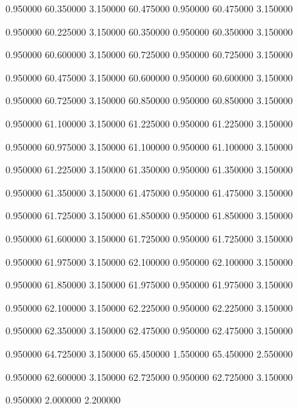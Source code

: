  {0.950000} {60.350000} {3.150000} {60.475000} {0.950000} {60.475000} {3.150000}

 {0.950000} {60.225000} {3.150000} {60.350000} {0.950000} {60.350000} {3.150000}

 {0.950000} {60.600000} {3.150000} {60.725000} {0.950000} {60.725000} {3.150000}

 {0.950000} {60.475000} {3.150000} {60.600000} {0.950000} {60.600000} {3.150000}

 {0.950000} {60.725000} {3.150000} {60.850000} {0.950000} {60.850000} {3.150000}

 {0.950000} {61.100000} {3.150000} {61.225000} {0.950000} {61.225000} {3.150000}

 {0.950000} {60.975000} {3.150000} {61.100000} {0.950000} {61.100000} {3.150000}

 {0.950000} {61.225000} {3.150000} {61.350000} {0.950000} {61.350000} {3.150000}

 {0.950000} {61.350000} {3.150000} {61.475000} {0.950000} {61.475000} {3.150000}

 {0.950000} {61.725000} {3.150000} {61.850000} {0.950000} {61.850000} {3.150000}

 {0.950000} {61.600000} {3.150000} {61.725000} {0.950000} {61.725000} {3.150000}

 {0.950000} {61.975000} {3.150000} {62.100000} {0.950000} {62.100000} {3.150000}

 {0.950000} {61.850000} {3.150000} {61.975000} {0.950000} {61.975000} {3.150000}

 {0.950000} {62.100000} {3.150000} {62.225000} {0.950000} {62.225000} {3.150000}

 {0.950000} {62.350000} {3.150000} {62.475000} {0.950000} {62.475000} {3.150000}

 {0.950000} {64.725000} {3.150000} {65.450000} {1.550000} {65.450000} {2.550000}

 {0.950000} {62.600000} {3.150000} {62.725000} {0.950000} {62.725000} {3.150000}

 {0.950000} {2.000000} {2.200000}

